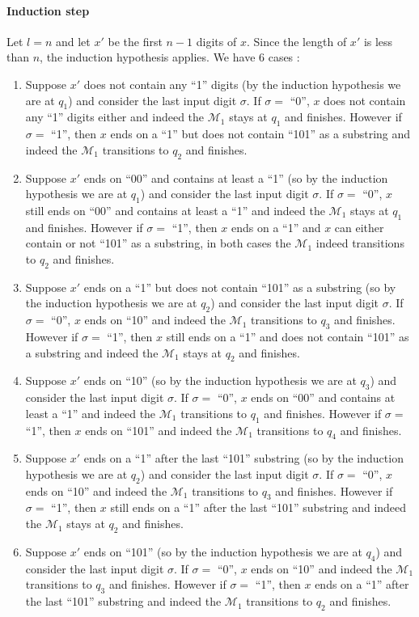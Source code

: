 \documentclass{article}
\begin{document}
\paragraph{Induction step} Let $l=n$ and let $x'$ be the first $n-1$ digits of $x$. Since the length of $x'$ is less than $n$, the induction hypothesis applies. We have 6 cases :
\begin{enumerate}
  \item Suppose $x'$ does not contain any “1” digits (by the induction hypothesis we are at $q_1$) and consider the last input digit $\sigma$. If $\sigma=$ “0”, $x$ does not contain any “1” digits either and indeed the $\mathcal{M}_1$ stays at $q_1$ and finishes. However if $\sigma=$ “1”, then $x$ ends on a “1” but does not contain “101” as a substring and indeed the $\mathcal{M}_1$ transitions to $q_2$ and finishes.
  \item Suppose $x'$ ends on “00” and contains at least a “1” (so by the induction hypothesis we are at $q_1$) and consider the last input digit $\sigma$. If $\sigma=$ “0”, $x$ still ends on “00” and contains at least a “1” and indeed the $\mathcal{M}_1$ stays at $q_1$ and finishes. However if $\sigma=$ “1”, then $x$ ends on a “1” and $x$ can either contain or not “101” as a substring, in both cases the $\mathcal{M}_1$ indeed transitions to $q_2$ and finishes.
  \item Suppose $x'$ ends on a “1” but does not contain “101” as a substring (so by the induction hypothesis we are at $q_2$) and consider the last input digit $\sigma$. If $\sigma=$ “0”, $x$ ends on “10” and indeed the $\mathcal{M}_1$ transitions to $q_3$ and finishes. However if $\sigma=$ “1”, then $x$ still ends on a “1” and does not contain “101” as a substring and indeed the $\mathcal{M}_1$ stays at $q_2$ and finishes.
  \item Suppose $x'$ ends on  “10” (so by the induction hypothesis we are at $q_3$) and consider the last input digit $\sigma$. If $\sigma=$ “0”, $x$ ends on “00” and contains at least a “1” and indeed the $\mathcal{M}_1$ transitions to $q_1$ and finishes. However if $\sigma=$ “1”, then $x$ ends on “101” and indeed the $\mathcal{M}_1$ transitions to $q_4$ and finishes.
  \item Suppose $x'$ ends on a “1” after the last “101” substring (so by the induction hypothesis we are at $q_2$) and consider the last input digit $\sigma$. If $\sigma=$ “0”, $x$ ends on “10” and indeed the $\mathcal{M}_1$ transitions to $q_3$ and finishes. However if $\sigma=$ “1”, then $x$ still ends on a “1” after the last “101” substring and indeed the $\mathcal{M}_1$ stays at $q_2$ and finishes.
  \item Suppose $x'$ ends on  “101” (so by the induction hypothesis we are at $q_4$) and consider the last input digit $\sigma$. If $\sigma=$ “0”, $x$ ends on “10” and indeed the $\mathcal{M}_1$ transitions to $q_3$ and finishes. However if $\sigma=$ “1”, then $x$ ends on a “1” after the last “101” substring and indeed the $\mathcal{M}_1$ transitions to $q_2$ and finishes.
\end{enumerate}
\end{document}
